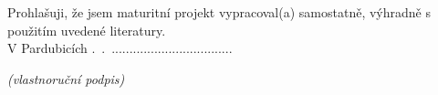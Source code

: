 \newpage
\thispagestyle{empty}
\noindent
Prohlašuji, že jsem maturitní projekt vypracoval(a) samostatně, výhradně s použitím uvedené literatury. \\

V Pardubicích \number\day.~\number\month.~\number\year \hfill ..................................

\hfill \textit{(vlastnoruční podpis)}